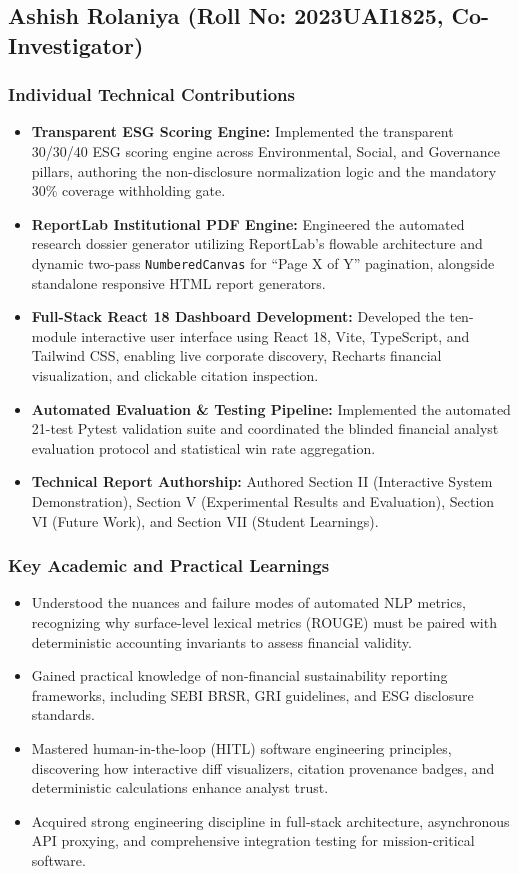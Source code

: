 \documentclass[conference]{IEEEtran}
\begin{document}
\subsection{Ashish Rolaniya (Roll No: 2023UAI1825, Co-Investigator)}

\subsubsection{Individual Technical Contributions}
\begin{itemize}
    \item \textbf{Transparent ESG Scoring Engine:} Implemented the transparent 30/30/40 ESG scoring engine across Environmental, Social, and Governance pillars, authoring the non-disclosure normalization logic and the mandatory 30\% coverage withholding gate.
    \item \textbf{ReportLab Institutional PDF Engine:} Engineered the automated research dossier generator utilizing ReportLab's flowable architecture and dynamic two-pass \texttt{NumberedCanvas} for ``Page X of Y'' pagination, alongside standalone responsive HTML report generators.
    \item \textbf{Full-Stack React 18 Dashboard Development:} Developed the ten-module interactive user interface using React 18, Vite, TypeScript, and Tailwind CSS, enabling live corporate discovery, Recharts financial visualization, and clickable citation inspection.
    \item \textbf{Automated Evaluation \& Testing Pipeline:} Implemented the automated 21-test Pytest validation suite and coordinated the blinded financial analyst evaluation protocol and statistical win rate aggregation.
    \item \textbf{Technical Report Authorship:} Authored Section II (Interactive System Demonstration), Section V (Experimental Results and Evaluation), Section VI (Future Work), and Section VII (Student Learnings).
\end{itemize}

\subsubsection{Key Academic and Practical Learnings}
\begin{itemize}
    \item Understood the nuances and failure modes of automated NLP metrics, recognizing why surface-level lexical metrics (ROUGE) must be paired with deterministic accounting invariants to assess financial validity.
    \item Gained practical knowledge of non-financial sustainability reporting frameworks, including SEBI BRSR, GRI guidelines, and ESG disclosure standards.
    \item Mastered human-in-the-loop (HITL) software engineering principles, discovering how interactive diff visualizers, citation provenance badges, and deterministic calculations enhance analyst trust.
    \item Acquired strong engineering discipline in full-stack architecture, asynchronous API proxying, and comprehensive integration testing for mission-critical software.
\end{itemize}
\end{document}
